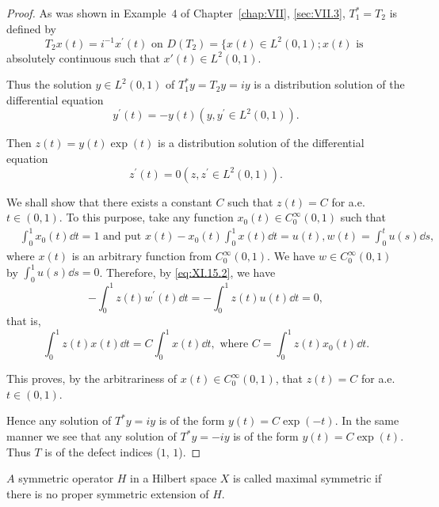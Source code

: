 \begin{proof}
 As was shown in Example~\hyperref[ex:VII.3.Example.4]{$4$} of Chapter~\ref{chap:VII}, \ref{sec:VII.3}, $T_1^* = T_2$ is defined by 
\[
T _{2} x (t) = i ^{-1} x ^{\prime} (t) \text{ on } D (T _{2}) = \{x (t) \in L ^{2} (0, 1); x (t) \text{ is }
\]
absolutely continuous such that $x'(t) \in L^2(0, 1)$. 

Thus the solution $y \in L^2(0,1)$ of $T_1^*y = T_2y = iy$ is a distribution solution of the differential equation 
\begin{equation}\label{eq:XI.15.1}
y ^{\prime} (t) = - y (t) \left(y, y ^{\prime} \in L ^{2} (0, 1)\right).
\end{equation}

Then $z(t) = y(t) \exp(t)$ is a distribution solution of the differential equation 
\begin{equation}\label{eq:XI.15.2}
z ^{\prime} (t) = 0 \left(z, z ^{\prime} \in L ^{2} (0, 1)\right).
\end{equation}

We shall show that there exists a constant $C$ such that $z(t) = C$ for a.e. $t \in (0,1)$. To this purpose, take any function $x_0(t) \in C_0^\infty(0,1)$ such that 
\[
\begin{aligned}
&\int_{0} ^{1} x _{0} (t) \dd t  = 1 \text{ and put } x (t) - x _{0} (t) \int_{0} ^{1} x (t) \dd t  = u (t), w (t) = \int_{0} ^{t} u (s) \dd s,
\end{aligned}
\]
where $x(t)$ is an arbitrary function from $C_0^\infty(0,1)$. We have $w \in C_0^\infty(0,1)$ by $\int_{0}^{1} u(s) \dd s = 0$. Therefore, by \eqref{eq:XI.15.2}, we have 
\[
- \int_{0} ^{1} z (t) w ^{\prime} (t) \dd t = - \int_{0} ^{1} z (t) u (t) \dd t = 0,
\]
that is, 
\[
\int_{0} ^{1} z (t) x (t) \dd t = C \int_{0} ^{1} x (t) \dd t, \text{ where } C = \int_{0} ^{1} z (t) x _{0} (t) \dd t.
\]

This proves, by the arbitrariness of $x(t) \in C_0^\infty(0,1)$, that $z(t) = C$ for a.e. $t \in (0,1)$. 

Hence any solution of $T^{*}y = iy$ is of the form $y(t) = C\exp (-t)$. In the same manner we see that any solution of $T^{*}y = -iy$ is of the form $y(t) = C\exp (t)$. Thus $T$ is of the defect indices ($1$, $1$). 
\end{proof}

\begin{definition}\label{def:XI.15.Definition.2} $A$ symmetric operator $H$ in a Hilbert space $X$ is called maximal symmetric if there is no proper symmetric extension of $H$. 
\end{definition}

